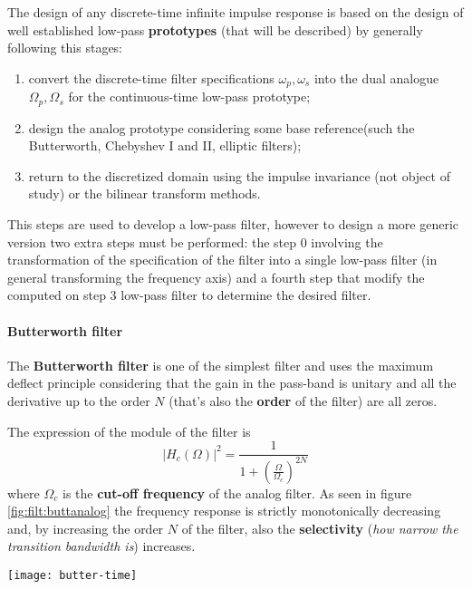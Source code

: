 	The design of any discrete-time infinite impulse response is based on the design of well established low-pass \textbf{prototypes} (that will be described) by generally following this stages:
	\begin{enumerate}
		\item convert the discrete-time filter specifications $\omega_p,\omega_s$ into the dual analogue $\Omega_p,\Omega_s$ for the continuous-time low-pass prototype;
		\item design the analog prototype considering some base reference(such the Butterworth, Chebyshev I and II, elliptic filters);
		\item return to the discretized domain using the impulse invariance (not object of study) or the bilinear transform methods.		
	\end{enumerate}
	This steps are used to develop a low-pass filter, however to design a more generic version two extra steps must be performed: the step 0 involving the transformation of the specification of the filter into a single low-pass  filter (in general transforming the frequency axis) and a fourth step that modify the computed on step 3 low-pass filter to determine the desired filter.
	
	\paragraph{Butterworth filter} The \textbf{Butterworth filter} is one of the simplest filter and uses the maximum deflect principle considering that the gain in the pass-band is unitary and all the derivative up to the order $N$ (that's also the \textbf{order} of the filter) are all zeros.
	
	The expression of the module of the filter is
	\begin{equation} \label{eq:filt:magbutter}
		\big|H_c(\Omega)\big|^2 = \frac{1}{1 + \left( \frac{\Omega}{\Omega_c} \right)^{2N}}
	\end{equation}
	where $\Omega_c$ is the \textbf{cut-off frequency} of the analog filter. As seen in figure \ref{fig:filt:buttanalog} the frequency response is strictly monotonically decreasing and, by increasing the order $N$ of the filter, also the \textbf{selectivity} (\textit{how narrow the transition bandwidth is}) increases.
	
	\begin{SCfigure}[2][bht]
		\centering \texttt{[image: butter-time]}
		\caption{frequency response of the Butterworth filter with cut-off frequency $\Omega_c=0$ for various order $N$.} \label{fig:filt:buttanalog}
	\end{SCfigure}

